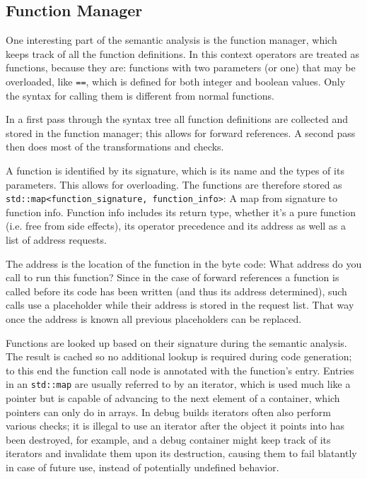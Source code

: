 		\subsection{Function Manager}
			
			One interesting part of the semantic analysis is the function manager, which keeps track of all the function definitions. In this context operators are treated as functions, because they are: functions with two parameters (or one) that may be overloaded, like \lstinline$==$, which is defined for both integer and boolean values. Only the syntax for calling them is different from normal functions.
			
			In a first pass through the syntax tree all function definitions are collected and stored in the function manager; this allows for forward references. A second pass then does most of the transformations and checks.
			
			A function is identified by its signature, which is its name and the types of its parameters. This allows for overloading. The functions are therefore stored as \lstinline$std::map<function_signature, function_info>$: A map from signature to function info. Function info includes its return type, whether it's a pure function (i.e. free from side effects), its operator precedence and its address as well as a list of address requests.
			
			The address is the location of the function in the byte code: What address do you call to run this function? Since in the case of forward references a function is called before its code has been written (and thus its address determined), such calls use a placeholder while their address is stored in the request list. That way once the address is known all previous placeholders can be replaced.
			
			Functions are looked up based on their signature during the semantic analysis. The result is cached so no additional lookup is required during code generation; to this end the function call node is annotated with the function's entry. Entries in an \lstinline$std::map$ are usually referred to by an iterator, which is used much like a pointer but is capable of advancing to the next element of a container, which pointers can only do in arrays. In debug builds iterators often also perform various checks; it is illegal to use an iterator after the object it points into has been destroyed, for example, and a debug container might keep track of its iterators and invalidate them upon its destruction, causing them to fail blatantly in case of future use, instead of potentially undefined behavior.
			
